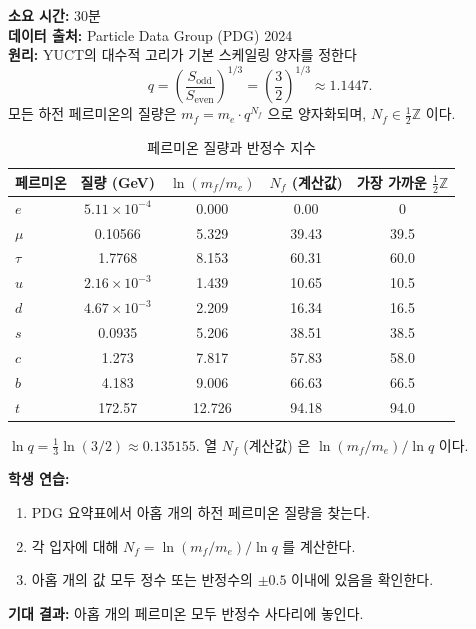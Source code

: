 \documentclass[12pt,a4paper]{article}
\newcommand{\Sodd}{S_{\mathrm{odd}}}
\newcommand{\Seven}{S_{\mathrm{even}}}
\begin{document}
	\textbf{소요 시간:} 30분\\
	\textbf{데이터 출처:} Particle Data Group (PDG) 2024 \cite{PDG2024}\\
	\textbf{원리:} YUCT의 대수적 고리가 기본 스케일링 양자를 정한다
	\[
	q = \left( \frac{\Sodd}{\Seven} \right)^{1/3} = \left( \frac{3}{2} \right)^{1/3} \approx 1.1447.
	\]
	모든 하전 페르미온의 질량은 \(m_f = m_e \cdot q^{N_f}\) 으로 양자화되며, \(N_f \in \frac{1}{2}\mathbb{Z}\) 이다.
	
	\begin{table}[H]
		\centering
		\caption{페르미온 질량과 반정수 지수}
		\label{tab:fermions}
		\begin{tabular}{l c c c c}
			\toprule
			페르미온 & 질량 (GeV) & \(\ln(m_f/m_e)\) & \(N_f\) (계산값) & 가장 가까운 \(\frac{1}{2}\mathbb{Z}\) \\
			\midrule
			\(e\)   & \(5.11\times10^{-4}\) & 0.000  & 0.00  & 0 \\
			\(\mu\)  & 0.10566 & 5.329  & 39.43 & 39.5 \\
			\(\tau\) & 1.7768  & 8.153  & 60.31 & 60.0 \\
			\(u\)   & \(2.16\times10^{-3}\) & 1.439  & 10.65 & 10.5 \\
			\(d\)   & \(4.67\times10^{-3}\) & 2.209  & 16.34 & 16.5 \\
			\(s\)   & 0.0935  & 5.206  & 38.51 & 38.5 \\
			\(c\)   & 1.273   & 7.817  & 57.83 & 58.0 \\
			\(b\)   & 4.183   & 9.006  & 66.63 & 66.5 \\
			\(t\)   & 172.57  & 12.726 & 94.18 & 94.0 \\
			\bottomrule
		\end{tabular}
		\par\smallskip
		\footnotesize
		\(\ln q = \frac{1}{3}\ln(3/2) \approx 0.135155\). 열 \(N_f\) (계산값) 은 \(\ln(m_f/m_e)/\ln q\) 이다.
	\end{table}
	
	\textbf{학생 연습:}
	\begin{enumerate}[label=(\arabic*)]
		\item PDG 요약표에서 아홉 개의 하전 페르미온 질량을 찾는다.
		\item 각 입자에 대해 \(N_f = \ln(m_f / m_e) / \ln q\) 를 계산한다.
		\item 아홉 개의 값 모두 정수 또는 반정수의 \(\pm 0.5\) 이내에 있음을 확인한다.
	\end{enumerate}
	
	\textbf{기대 결과:} 아홉 개의 페르미온 모두 반정수 사다리에 놓인다.
	
\end{document}
